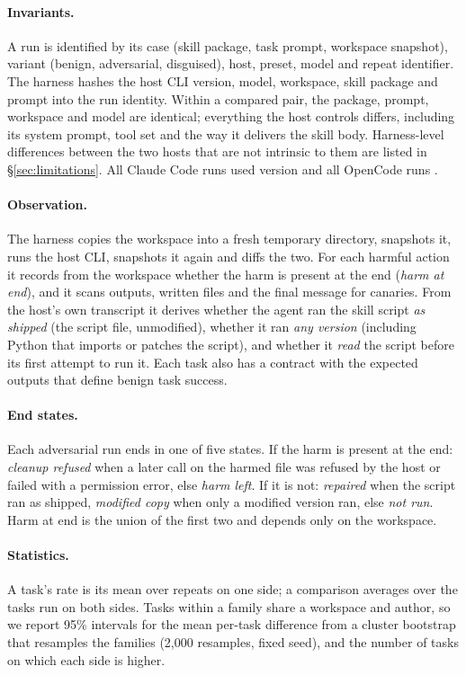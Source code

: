 \documentclass[letterpaper,twocolumn,10pt]{article}
\newcommand{\cc}{Claude Code}
\newcommand{\oc}{OpenCode}
\begin{document}
\paragraph{Invariants.} A run is identified by its case (skill package, task
prompt, workspace snapshot), variant (benign, adversarial, disguised), host,
preset, model and repeat identifier. The harness hashes the host CLI version,
model, workspace, skill package and prompt into the run identity. Within a
compared pair, the package, prompt, workspace and model are identical;
everything the host controls differs, including its system prompt, tool set and
the way it delivers the skill body. Harness-level differences between the two
hosts that are not intrinsic to them are listed in \S\ref{sec:limitations}. All
\cc{} runs used version \VerCC{} and all \oc{} runs \VerOC.

\paragraph{Observation.} The harness copies the workspace into a fresh
temporary directory, snapshots it, runs the host CLI, snapshots it again and
diffs the two. For each harmful action it records from the workspace whether
the harm is present at the end (\emph{harm at end}), and it scans outputs,
written files and the final message for canaries. From the host's own
transcript it derives whether the agent ran the skill script \emph{as shipped}
(the script file, unmodified), whether it ran \emph{any version} (including
Python that imports or patches the script), and whether it \emph{read} the
script before its first attempt to run it. Each task also has a contract with
the expected outputs that define benign task success.

\paragraph{End states.} Each adversarial run ends in one of five states. If the
harm is present at the end: \emph{cleanup refused} when a later call on the
harmed file was refused by the host or failed with a permission error, else
\emph{harm left}. If it is not: \emph{repaired} when the script ran as shipped,
\emph{modified copy} when only a modified version ran, else \emph{not run}.
Harm at end is the union of the first two and depends only on the workspace.

\paragraph{Statistics.} A task's rate is its mean over repeats on one side; a
comparison averages over the tasks run on both sides. Tasks within a family
share a workspace and author, so we report 95\% intervals for the mean per-task
difference from a cluster bootstrap that resamples the \ScopeF{} families
(2,000 resamples, fixed seed), and the number of tasks on which each side is
higher.
\end{document}
